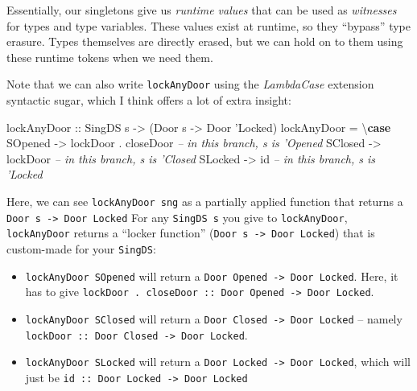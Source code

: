 \documentclass[]{article}
\newenvironment{Shaded}{\begin{snugshade}}{\end{snugshade}}
\newcommand{\CharTok}[1]{\textcolor[rgb]{0.31,0.60,0.02}{#1}}
\newcommand{\CommentTok}[1]{\textcolor[rgb]{0.56,0.35,0.01}{\textit{#1}}}
\newcommand{\DataTypeTok}[1]{\textcolor[rgb]{0.13,0.29,0.53}{#1}}
\newcommand{\FunctionTok}[1]{\textcolor[rgb]{0.00,0.00,0.00}{#1}}
\newcommand{\KeywordTok}[1]{\textcolor[rgb]{0.13,0.29,0.53}{\textbf{#1}}}
\newcommand{\NormalTok}[1]{#1}
\newcommand{\OtherTok}[1]{\textcolor[rgb]{0.56,0.35,0.01}{#1}}
\begin{document}
Essentially, our singletons give us \emph{runtime values} that can be used as
\emph{witnesses} for types and type variables. These values exist at runtime, so
they ``bypass'' type erasure. Types themselves are directly erased, but we can
hold on to them using these runtime tokens when we need them.

Note that we can also write \texttt{lockAnyDoor} using the \emph{LambdaCase}
extension syntactic sugar, which I think offers a lot of extra insight:

\begin{Shaded}
\begin{Highlighting}[]
\OtherTok{lockAnyDoor ::} \DataTypeTok{SingDS}\NormalTok{ s }\OtherTok{->}\NormalTok{ (}\DataTypeTok{Door}\NormalTok{ s }\OtherTok{->} \DataTypeTok{Door} \CharTok{'Locked)}
\NormalTok{lockAnyDoor }\FunctionTok{=}\NormalTok{ \textbackslash{}}\KeywordTok{case}
    \DataTypeTok{SOpened} \OtherTok{->}\NormalTok{ lockDoor }\FunctionTok{.}\NormalTok{ closeDoor  }\CommentTok{-- in this branch, s is 'Opened}
    \DataTypeTok{SClosed} \OtherTok{->}\NormalTok{ lockDoor              }\CommentTok{-- in this branch, s is 'Closed}
    \DataTypeTok{SLocked} \OtherTok{->}\NormalTok{ id                    }\CommentTok{-- in this branch, s is 'Locked}
\end{Highlighting}
\end{Shaded}

Here, we can see \texttt{lockAnyDoor\ sng} as a partially applied function that
returns a \texttt{Door\ s\ -\textgreater{}\ Door\ \textquotesingle{}Locked} For
any \texttt{SingDS\ s} you give to \texttt{lockAnyDoor}, \texttt{lockAnyDoor}
returns a ``locker function''
(\texttt{Door\ s\ -\textgreater{}\ Door\ \textquotesingle{}Locked}) that is
custom-made for your \texttt{SingDS}:

\begin{itemize}
\item
  \texttt{lockAnyDoor\ SOpened} will return a
  \texttt{Door\ \textquotesingle{}Opened\ -\textgreater{}\ Door\ \textquotesingle{}Locked}.
  Here, it has to give
  \texttt{lockDoor\ .\ closeDoor\ ::\ Door\ \textquotesingle{}Opened\ -\textgreater{}\ Door\ \textquotesingle{}Locked}.
\item
  \texttt{lockAnyDoor\ SClosed} will return a
  \texttt{Door\ \textquotesingle{}Closed\ -\textgreater{}\ Door\ \textquotesingle{}Locked}
  -- namely
  \texttt{lockDoor\ ::\ Door\ \textquotesingle{}Closed\ -\textgreater{}\ Door\ \textquotesingle{}Locked}.
\item
  \texttt{lockAnyDoor\ SLocked} will return a
  \texttt{Door\ \textquotesingle{}Locked\ -\textgreater{}\ Door\ \textquotesingle{}Locked},
  which will just be
  \texttt{id\ ::\ Door\ \textquotesingle{}Locked\ -\textgreater{}\ Door\ \textquotesingle{}Locked}
\end{itemize}
\end{document}
